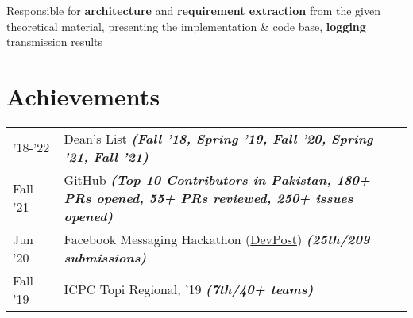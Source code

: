 \documentclass[]{openfont}
\begin{document}
\begin{minipage}[t]{0.66\textwidth}
\begin{tightemize}
    \item Responsible for \textbf{architecture} and \textbf{requirement extraction} from the given theoretical material, presenting the implementation \& code base, \textbf{logging} transmission results
\end{tightemize} 
\sectionsep


\section{Achievements} 
\begin{tabular}{lll}
'18-'22         & Dean's List {\footnotesize \textit{\textbf{(Fall '18, Spring '19, Fall '20, Spring '21, Fall '21)}}} \\
Fall '21             & GitHub {\footnotesize \textit{\textbf{(Top 10 Contributors in Pakistan, 180+ PRs opened, 55+ PRs reviewed, 250+ issues opened)}}} \\
Jun '20             & Facebook Messaging Hackathon (\href{https://fbmessaging2.devpost.com/project-gallery?page=2}{DevPost}) {\footnotesize{\textit{\textbf{(25th/209 submissions)}}}} \\
Fall '19             & ICPC Topi Regional, '19 {\footnotesize \textit{\textbf{(7th/40+ teams)}}} \\
\end{tabular}
\sectionsep

\end{minipage} 
\end{document}
